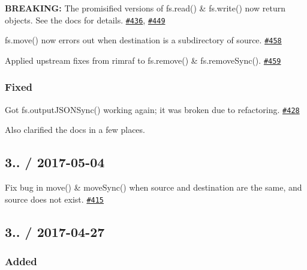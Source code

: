 \begin{DoxyItemize}
\item {\bfseries B\+R\+E\+A\+K\+I\+NG\+:} The promisified versions of {\ttfamily fs.\+read()} \& {\ttfamily fs.\+write()} now return objects. See the docs for details. \href{https://github.com/jprichardson/node-fs-extra/issues/436}{\tt \#436}, \href{https://github.com/jprichardson/node-fs-extra/pull/449}{\tt \#449}
\item {\ttfamily fs.\+move()} now errors out when destination is a subdirectory of source. \href{https://github.com/jprichardson/node-fs-extra/pull/458}{\tt \#458}
\item Applied upstream fixes from {\ttfamily rimraf} to {\ttfamily fs.\+remove()} \& {\ttfamily fs.\+remove\+Sync()}. \href{https://github.com/jprichardson/node-fs-extra/pull/459}{\tt \#459}
\end{DoxyItemize}

\subsubsection*{Fixed}


\begin{DoxyItemize}
\item Got {\ttfamily fs.\+output\+J\+S\+O\+N\+Sync()} working again; it was broken due to refactoring. \href{https://github.com/jprichardson/node-fs-extra/pull/428}{\tt \#428}
\end{DoxyItemize}

Also clarified the docs in a few places.

\subsection*{3.. / 2017-\/05-\/04 }


\begin{DoxyItemize}
\item Fix bug in {\ttfamily move()} \& {\ttfamily move\+Sync()} when source and destination are the same, and source does not exist. \href{https://github.com/jprichardson/node-fs-extra/pull/415}{\tt \#415}
\end{DoxyItemize}

\subsection*{3.. / 2017-\/04-\/27 }

\subsubsection*{Added}


